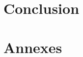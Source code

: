 \documentclass[a4paper,10pt]{article}
\begin{document}
\section{Conclusion}



\section{Annexes}


\end{document}
